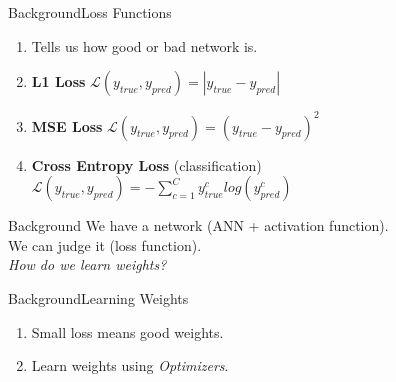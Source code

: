 \documentclass[handout]{beamer}
\begin{document}
\begin{frame}{Background}{Loss Functions}
\begin{enumerate}
  \item Tells us how good or bad network is. \\

  \item \textbf{L1 Loss} $\mathcal{L}(y_{true},y_{pred}) = |y_{true}-y_{pred}|$ \\

  \item \textbf{MSE Loss} $\mathcal{L}(y_{true},y_{pred}) = (y_{true}-y_{pred})^2$ \\

  \item \textbf{Cross Entropy Loss} (classification) $\mathcal{L}(y_{true},y_{pred}) = -\sum_{c=1}^{C}y^c_{true}log(y^c_{pred})$ \\
\end{enumerate}
\end{frame}

\begin{frame}{Background}{}
    \center
    \Large{\color{blue}We have a network (ANN + activation function). \\
    We can judge it (loss function). \\
    \textit{How do we learn weights?}}
\end{frame}

\begin{frame}{Background}{Learning Weights}
  \begin{enumerate}
    \item Small loss means good weights.
    \item Learn weights using \textit{Optimizers}.
  \end{enumerate}
\end{frame}

\end{document}
